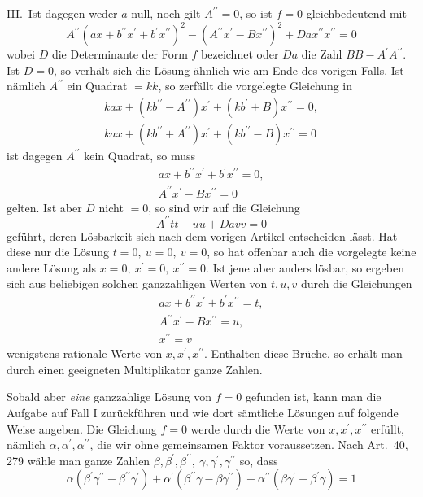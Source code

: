 III.\ Ist dagegen weder \(a\) null, noch gilt \(A^{\prime\prime}=0\), so ist \(f=0\) gleichbedeutend mit
\[A^{\prime\prime}(ax+b^{\prime\prime}x^\prime+b^\prime x^{\prime\prime})^2-(A^{\prime\prime}x^\prime-Bx^{\prime\prime})^2+Da x^{\prime\prime}x^{\prime\prime}=0\]
wobei \(D\) die Determinante der Form \(f\) bezeichnet oder \(Da\) die Zahl \(BB-A^\prime A^{\prime\prime}\). Ist \(D=0\), so verhält sich die Lösung ähnlich wie am Ende des vorigen Falls. Ist nämlich \(A^{\prime\prime}\) ein Quadrat \(=kk\), so zerfällt die vorgelegte Gleichung in
\[\begin{gathered}kax+(kb^{\prime\prime}-A^{\prime\prime})x^\prime+(kb^\prime+B)x^{\prime\prime}=0,\\ kax+(kb^{\prime\prime}+A^{\prime\prime})x^\prime+(kb^{\prime\prime}-B)x^{\prime\prime}=0\end{gathered}\]
ist dagegen \(A^{\prime\prime}\) kein Quadrat, so muss
\[\begin{gathered}ax+b^{\prime\prime}x^\prime+b^\prime x^{\prime\prime}=0,\\ A^{\prime\prime}x^\prime-Bx^{\prime\prime}=0\end{gathered}\]
gelten. Ist aber \(D\) nicht \(=0\), so sind wir auf die Gleichung
\[A^{\prime\prime}tt-uu+Davv=0\]
geführt, deren Lösbarkeit sich nach dem vorigen Artikel entscheiden lässt. Hat diese nur die Lösung \(t=0,\ u=0,\ v=0\), so hat offenbar auch die vorgelegte keine andere Lösung als \(x=0,\ x^\prime=0,\ x^{\prime\prime}=0\). Ist jene aber anders lösbar, so ergeben sich aus beliebigen solchen ganzzahligen Werten von \(t,u,v\) durch die Gleichungen
\[\begin{gathered}ax+b^{\prime\prime}x^\prime+b^\prime x^{\prime\prime}=t,\\ A^{\prime\prime}x^\prime-Bx^{\prime\prime}=u,\\ x^{\prime\prime}=v\end{gathered}\]
wenigstens rationale Werte von \(x,x^\prime,x^{\prime\prime}\). Enthalten diese Brüche, so erhält man durch einen geeigneten Multiplikator ganze Zahlen.

Sobald aber \textit{eine} ganzzahlige Lösung von \(f=0\) gefunden ist, kann man die Aufgabe auf Fall I zurückführen und wie dort sämtliche Lösungen auf folgende Weise angeben. Die Gleichung \(f=0\) werde durch die Werte von \(x,x^\prime,x^{\prime\prime}\) erfüllt, nämlich \(\alpha,\alpha^\prime,\alpha^{\prime\prime}\), die wir ohne gemeinsamen Faktor voraussetzen. Nach Art.\ 40, 279 wähle man ganze Zahlen \(\beta,\beta^\prime,\beta^{\prime\prime},\ \gamma,\gamma^\prime,\gamma^{\prime\prime}\) so, dass
\[\alpha(\beta^\prime\gamma^{\prime\prime}-\beta^{\prime\prime}\gamma^\prime)+\alpha^\prime(\beta^{\prime\prime}\gamma-\beta\gamma^{\prime\prime})+\alpha^{\prime\prime}(\beta\gamma^\prime-\beta^\prime\gamma)=1\]

